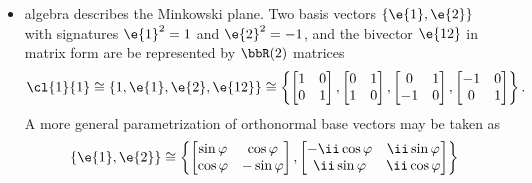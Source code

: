 \begin{unit}
\begin{itemize}
\begin{align*}
\begin{bmatrix}-\cos\varphi&-\ii \sin\varphi\\ \ii \sin\varphi& \cos\varphi\end{bmatrix}
 \right\}.
\end{align*}
%
\item[\cl{1}{1}] algebra describes the Minkowski plane. Two basis
vectors $\{\e{1},\e{2}\}$ with signatures $\e{1}^2=1$ and
$\e{2}^2=-1$, and the bivector $\e{12}$ in matrix form are be
represented by $\bbR(2)$ matrices
\[\cl{1}{1}\cong\{1,\e{1},\e{2},\e{12}\}\cong\left\{
\begin{bmatrix}1&0\\0&1\end{bmatrix},
\begin{bmatrix}0&1\\1&0\end{bmatrix},
\begin{bmatrix}0&1\\-1&0\end{bmatrix},
\begin{bmatrix}-1&0\\0&1\end{bmatrix}
\right\}.\] A more general parametrization of 
orthonormal base vectors may be taken as
\begin{align*}
\{\e{1},\e{2}\}&\cong\left\{
\begin{bmatrix}\sin\varphi&\cos\varphi\\ \cos\varphi& -\sin\varphi\end{bmatrix},
 \begin{bmatrix}-\ii\cos\varphi&\ii\sin\varphi\\ \ii \sin\varphi& \ii \cos\varphi\end{bmatrix}
\right\}\\

\end{align*}
\end{itemize}
\end{unit}
